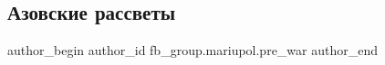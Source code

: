  
 
 
 
 

\subsection{Азовские рассветы}
\label{sec:26_01_2023.fb.fb_group.mariupol.pre_war.2.azovskie_rassveti}

\ifcmt
 author_begin
   author_id fb_group.mariupol.pre_war
 author_end
\fi
